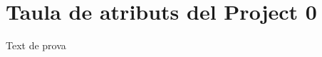 


\chapter{Taula de atributs del Project 0}

\begin{table}[h!]
	\begin{center}
		\tiny
	\end{center}
\end{table}

Text de prova
